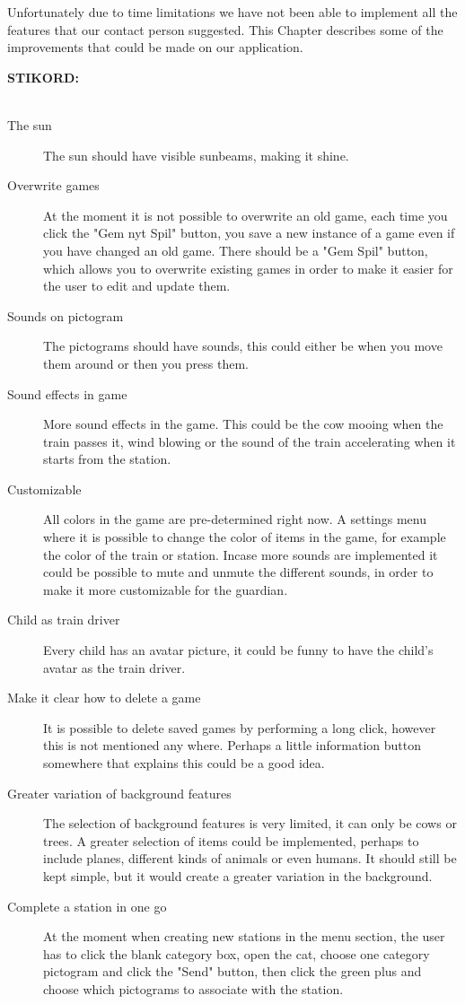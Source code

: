 Unfortunately due to time limitations we have not been able to implement all the features that our contact person suggested. This Chapter describes some of the improvements that could be made on our application.

\textbf{STIKORD:}\\\\

\begin{description}
\item[The sun] The sun should have visible sunbeams, making it shine. 
\item[Overwrite games] At the moment it is not possible to overwrite an old game, each time you click the "Gem nyt Spil" button, you save a new instance of a game even if you have changed an old game. There should be a "Gem Spil" button, which allows you to overwrite existing games in order to make it easier for the user to edit and update them.
\item[Sounds on pictogram] The pictograms should have sounds, this could either be when you move them around or then you press them. 
\item[Sound effects in game] More sound effects in the game. This could be the cow mooing when the train passes it, wind blowing or the sound of the train accelerating when it starts from the station.
\item[Customizable] All colors in the game are pre-determined right now. A settings menu where it is possible to change the color of items in the game, for example the color of the train or station. Incase more sounds are implemented it could be possible to mute and unmute the different sounds, in order to make it more customizable for the guardian.
\item[Child as train driver] Every child has an avatar picture, it could be funny to have the child's avatar as the train driver. 
\item[Make it clear how to delete a game] It is possible to delete saved games by performing a long click, however this is not mentioned any where. Perhaps a little information button somewhere that explains this could be a good idea. 
\item[Greater variation of background features] The selection of background features is very limited, it can only be cows or trees. A greater selection of items could be implemented, perhaps to include planes, different kinds of animals or even humans. It should still be kept simple, but it would create a greater variation in the background. 
\item[Complete a station in one go] At the moment when creating new stations in the menu section, the user has to click the blank category box, open the \ac{cat}, choose one category pictogram and click the "Send" button, then click the green plus and choose which pictograms to associate with the station.


\end{description}
